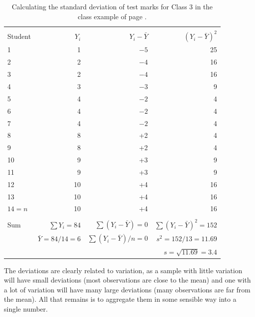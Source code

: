 \begin{table}
\caption{Calculating the standard deviation of test marks for Class 3 in
the class example of page \pageref{p_classex}.}
\label{t_sdex}
\begin{center}
\begin{tabular}{|l|rrr|}\hline
& \multicolumn{3}{|c|}{}\\
Student& $Y_{i}$ & $Y_{i}-\bar{Y}$ & $(Y_{i}-\bar{Y})^{2}$\\ \hline
1 & 1 & $-5$ & 25 \\
2 & 2& $-4$ & 16\\
3 & 2& $-4$ & 16\\
4 & 3& $-3$ & 9 \\
5& 4& $-2$& 4\\
6& 4& $-2$ & 4\\
7& 4& $-2$ & 4\\
8& 8& +2 & 4\\
9& 8& +2 & 4\\
10& 9& +3 & 9\\
11& 9& +3  & 9\\
12& 10& +4& 16 \\
13& 10& +4 & 16\\
$14=n$& 10& +4 & 16\\ \hline
& \multicolumn{3}{|c|}{}\\
Sum & $\sum Y_{i}=84$&
$\sum(Y_{i}-\bar{Y})=0$
&
$\sum(Y_{i}-\bar{Y})^{2}=152$\\
& $\bar{Y}=84/14=6$ &
$\sum(Y_{i}-\bar{Y})/n=0$
& $s^{2}=152/13=11.69$ \\
& & & $s=\sqrt{11.69}=3.4$ \\
\hline
\end{tabular}
\end{center}
\end{table}

The deviations are clearly related to variation, as a sample
with little variation will have small deviations (most observations are
close to the mean) and one with a lot of variation will have many large
deviations (many observations are far from the mean). All that remains
is to aggregate them in some sensible way into a single number.

